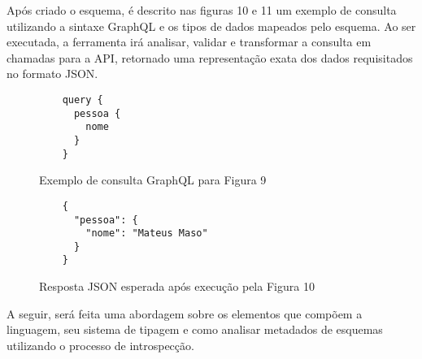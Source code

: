 Após criado o esquema, é descrito nas figuras 10 e 11 um exemplo de consulta utilizando a sintaxe GraphQL e os tipos de dados mapeados pelo esquema. Ao ser executada, a ferramenta irá analisar, validar e transformar a consulta em chamadas para a API, retornado uma representação exata dos dados requisitados no formato JSON. \cite{GraphQL2016}

\begin{figure}[H]
  \centering
  \begin{verbatim}
    query {
      pessoa {
        nome
      }
    }
  \end{verbatim}
  \caption{Exemplo de consulta GraphQL para Figura 9}
\end{figure}

\begin{figure}[H]
  \centering
  \begin{verbatim}
    {
      "pessoa": {
        "nome": "Mateus Maso"
      }
    }
  \end{verbatim}
  \caption{Resposta JSON esperada após execução pela Figura 10}
\end{figure}

A seguir, será feita uma abordagem sobre os elementos que compõem a linguagem, seu sistema de tipagem e como analisar metadados de esquemas utilizando o processo de introspecção.




